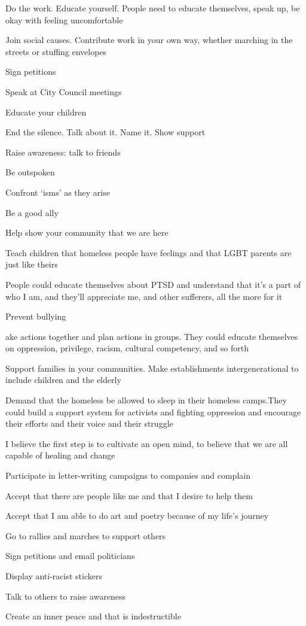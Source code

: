 \begin{multicols}{2}
	\begin{checkboxlist}
		\item Do the work. Educate yourself. People need to educate themselves, speak up, be okay with feeling uncomfortable
		\item Join social causes. Contribute work in your own way, whether marching in the streets or stuffing envelopes
		\item Sign petitions
		\item Speak at City Council meetings
		\item Educate your children
		\item End the silence. Talk about it. Name it. Show support
		\item Raise awareness: talk to friends
		\item Be outspoken
		\item Confront ‘isms’ as they arise
		\item Be a good ally
		\item Help show your community that we are here
		\item Teach children that homeless people have feelings and that LGBT parents are just like theirs
		\item People could educate themselves about PTSD and understand that it’s a part of who I am, and they’ll appreciate me, and other sufferers, all the more for it
		\item Prevent bullying
		\item ake actions together and plan actions in groups. They could educate themselves on oppression, privilege, racism, cultural competency, and so forth
		\item Support families in your communities. Make establishments intergenerational to include children and the elderly
		\item Demand that the homeless be allowed to sleep in their homeless camps.They could build a support system for activists and  fighting oppression and encourage their efforts and their voice and their struggle
		\item I believe the first step is to cultivate an open mind, to believe that we are all capable of healing and change
		\item Participate in letter-writing campaigns to companies and complain
		\item Accept that there are people like me and that I desire to help them
		\item Accept that I am able to do art and poetry because of my life’s journey
		\item Go to rallies and marches to support others
		\item Sign petitions and email politicians
		\item Display anti-racist stickers
		\item Talk to others to raise awareness
		\item Create an inner peace and that is indestructible
	\end{checkboxlist}
\end{multicols}

